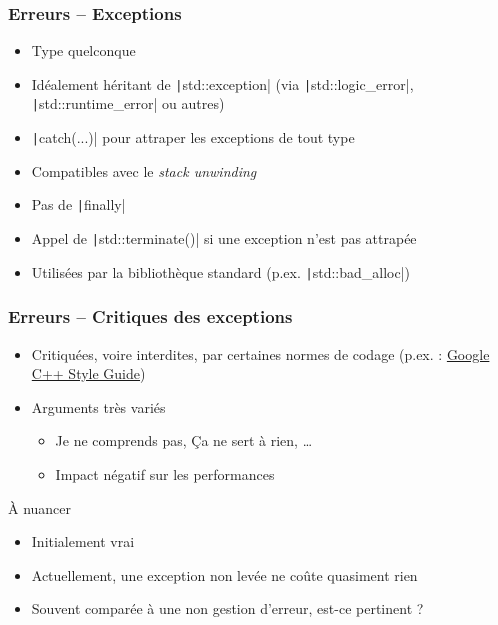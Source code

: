 \documentclass[C++.tex]{subfiles}
\begin{document}
\begin{frame}[fragile]
	\frametitle{Erreurs -- Exceptions}
	\begin{itemize}
		\item Type quelconque
		\item Idéalement héritant de \texttt|std::exception| (via \texttt|std::logic_error|, \texttt|std::runtime_error| ou autres)
		\item \texttt|catch(...)| pour attraper les exceptions de tout type
		\item Compatibles avec le \textit{stack unwinding}
		\item Pas de \texttt|finally|
		\item Appel de \texttt|std::terminate()| si une exception n'est pas attrapée
		\item Utilisées par la bibliothèque standard (p.ex. \texttt|std::bad_alloc|)
	\end{itemize}
\end{frame}

\begin{frame}[fragile]
	\frametitle{Erreurs -- Critiques des exceptions}
	\begin{itemize}
		\item Critiquées, voire interdites, par certaines normes de codage (p.ex. : \href{https://google.github.io/styleguide/cppguide.html}{Google C++ Style Guide\linklogo})
		\item Arguments très variés
		\begin{itemize}
			\item \og Je ne comprends pas\fg{}, \og Ça ne sert à rien\fg{}, \ldots{}
			\item Impact négatif sur les performances
		\end{itemize}
	\end{itemize}

	\begin{block}{À nuancer}
		\begin{itemize}
			\item Initialement vrai
			\item Actuellement, une exception non levée ne coûte quasiment rien
			\item Souvent comparée à une non gestion d'erreur, est-ce pertinent ?
		\end{itemize}
	\end{block}
\end{frame}
\end{document}
